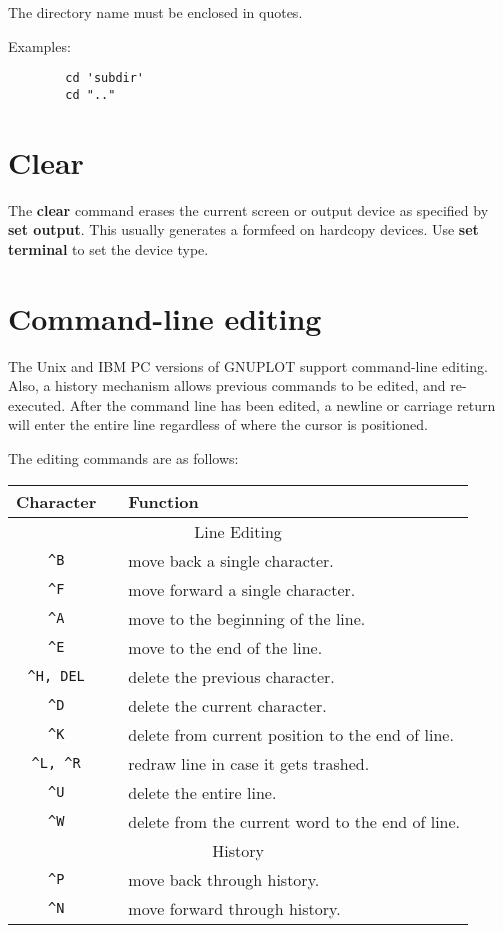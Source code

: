 The directory name must be enclosed in quotes.

Examples:
\begin{verbatim}
        cd 'subdir'
        cd ".."
\end{verbatim}
\section{Clear}
The {\bf clear} command erases the current screen or output device as
specified by {\bf set output}. This usually generates a formfeed on
hardcopy devices. Use {\bf set terminal} to set the device type.
\section{Command-line editing}
The Unix and IBM PC versions of GNUPLOT support command-line editing.
Also, a history mechanism allows previous commands to be edited, and
re-executed. After the command line has been edited, a newline or
carriage return will enter the entire line regardless of where the
cursor is positioned.

The editing commands are as follows:


\begin{center}
\begin{tabular}{|ccl|} \hline
Character && Function \\ \hline 
\multicolumn{3}{|c|}{Line Editing}\\
\verb~^B~ && move back a single character.\\
\verb~^F~ && move forward a single character.\\
\verb~^A~ && move to the beginning of the line.\\
\verb~^E~ && move to the end of the line.\\
\verb~^H, DEL~ && delete the previous character.\\
\verb~^D~ && delete the current character.\\
\verb~^K~ && delete from current position to the end of line.\\
\verb~^L, ^R~ && redraw line in case it gets trashed.\\
\verb~^U~ && delete the entire line. \\
\verb~^W~ && delete from the current word to the end of line. \\ \hline
\multicolumn{3}{|c|}{History} \\
\verb~^P~ && move back through history.\\
\verb~^N~ && move forward through history.\\
\hline
\end{tabular}
\end{center}

